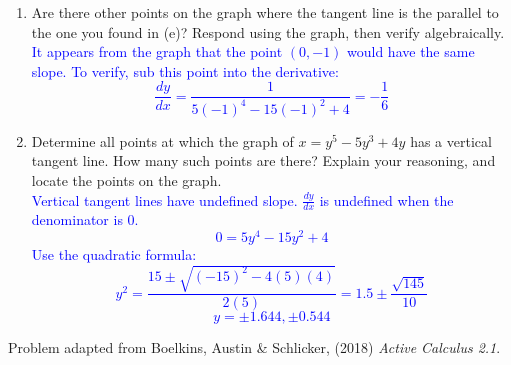 \documentclass{ximera}
\begin{document}
\begin{exercise}
\begin{enumerate}
    \textcolor{blue}{Slope: sub $x=0$ and $y=1$ into the derivative \\
    \[\frac{dy}{dx}=\frac{1}{5(1)^4-15(1)^2+4}=-\frac{1}{6}\]
    Tangent line: $y-1=-\frac16(x-0)$ or $y=-\frac16x+1$}
    \item Are there other points on the graph where the tangent line is the parallel to the one you found in (e)?  Respond using the graph, then verify algebraically.\\
    \textcolor{blue}{It appears from the graph that the point $(0,-1)$ would have the same slope.  To verify, sub this point into the derivative:\\
    \[\frac{dy}{dx}=\frac{1}{5(-1)^4-15(-1)^2+4}=-\frac{1}{6}\]}
    \item Determine all points at which the graph of $x=y^5-5y^3+4y$ has a vertical tangent line.  How many such points are there?  Explain your reasoning, and locate the points on the graph.\\
    \textcolor{blue}{Vertical tangent lines have undefined slope. $\frac{dy}{dx}$ is undefined when the denominator is 0.
    \[0=5y^4-15y^2+4\]
    Use the quadratic formula: 
    \[y^2=\frac{15\pm\sqrt{(-15)^2-4(5)(4)}}{2(5)}=1.5\pm\frac{\sqrt{145}}{10}\]
    \[y=\pm1.644, \pm0.544\]}
  \end{enumerate}
\end{exercise}

Problem adapted from Boelkins, Austin \& Schlicker, (2018) \textit{Active Calculus 2.1}.
\end{document}
